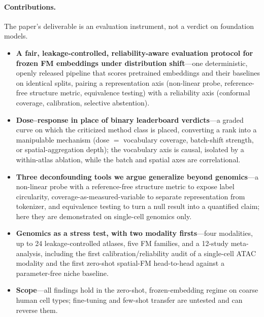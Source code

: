 \documentclass[fleqn,10pt,lineno]{wlpeerj}  %
\begin{document}
\paragraph{Contributions.} The paper's deliverable is an evaluation instrument, not a verdict on foundation models.
\begin{itemize}\itemsep2pt \parskip0pt 
\item \textbf{A fair, leakage-controlled, reliability-aware evaluation protocol for frozen FM embeddings under distribution shift}---one deterministic, openly released pipeline that scores pretrained embeddings and their baselines on identical splits, pairing a representation axis (non-linear probe, reference-free structure metric, equivalence testing) with a reliability axis (conformal coverage, calibration, selective abstention).
\item \textbf{Dose--response in place of binary leaderboard verdicts}---a graded curve on which the criticized method class is placed, converting a rank into a manipulable mechanism (dose $=$ vocabulary coverage, batch-shift strength, or spatial-aggregation depth); the vocabulary axis is causal, isolated by a within-atlas ablation, while the batch and spatial axes are correlational.
\item \textbf{Three deconfounding tools we argue generalize beyond genomics}---a non-linear probe with a reference-free structure metric to expose label circularity, coverage-as-measured-variable to separate representation from tokenizer, and equivalence testing to turn a null result into a quantified claim; here they are demonstrated on single-cell genomics only.
\item \textbf{Genomics as a stress test, with two modality firsts}---four modalities, up to 24 leakage-controlled atlases, five FM families, and a 12-study meta-analysis, including the first calibration/reliability audit of a single-cell ATAC modality and the first zero-shot spatial-FM head-to-head against a parameter-free niche baseline.
\item \textbf{Scope}---all findings hold in the zero-shot, frozen-embedding regime on coarse human cell types; fine-tuning and few-shot transfer are untested and can reverse them.
\end{itemize}
\end{document}
